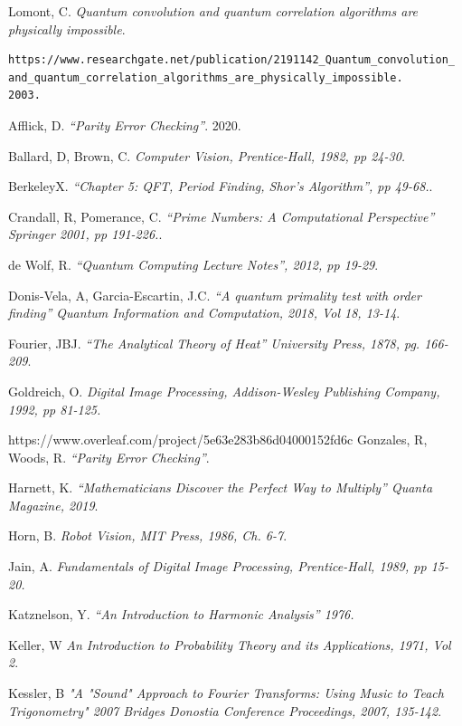 \documentclass[a4paper,11pt]{article}
\theoremstyle{mytheor}
\begin{document}
\begin{thebibliography}{9}
Lomont, C.
\textit{Quantum convolution and quantum correlation algorithms are physically impossible}.
\begin{verbatim}
https://www.researchgate.net/publication/2191142_Quantum_convolution_
and_quantum_correlation_algorithms_are_physically_impossible.
2003.
\end{verbatim}

Afflick, D.
\textit{“Parity Error Checking”}.
2020.

Ballard, D, Brown, C.
\textit{\emph{Computer Vision}, Prentice-Hall, 1982, pp 24-30.}

BerkeleyX.
\textit{“Chapter 5: QFT, Period Finding, Shor’s Algorithm”, pp 49-68.}.

Crandall, R, Pomerance, C.
\textit{“Prime Numbers: A Computational Perspective” Springer 2001, pp 191-226.}.

de Wolf, R.
\textit{“Quantum Computing Lecture Notes”, 2012, pp 19-29}.

Donis-Vela, A, Garcia-Escartin, J.C.
\textit{“A quantum primality test with order finding” Quantum Information and Computation, 2018, Vol 18, 13-14}.

Fourier, JBJ.
\textit{“The Analytical Theory of Heat” University Press, 1878, pg. 166-209}.

Goldreich, O.
\textit{Digital Image Processing, Addison-Wesley Publishing Company, 1992, pp 81-125.}

 https://www.overleaf.com/project/5e63e283b86d04000152fd6c
Gonzales, R, Woods, R.
\textit{“Parity Error Checking”}.

Harnett, K.
\textit{“Mathematicians Discover the Perfect Way to Multiply” Quanta Magazine, 2019}.

Horn, B.
\textit{Robot Vision, MIT Press, 1986, Ch. 6-7}.

Jain, A.
\textit{Fundamentals of Digital Image Processing, Prentice-Hall, 1989, pp 15-20.}

Katznelson, Y.
\textit{“An Introduction to Harmonic Analysis” 1976.}

Keller, W
\textit{An Introduction to Probability Theory and its Applications, 1971, Vol 2}.

Kessler, B
\textit{"A "Sound" Approach to Fourier Transforms: Using Music to Teach Trigonometry" 2007 Bridges Donostia Conference Proceedings, 2007, 135-142}.


\end{thebibliography}
\end{document}
